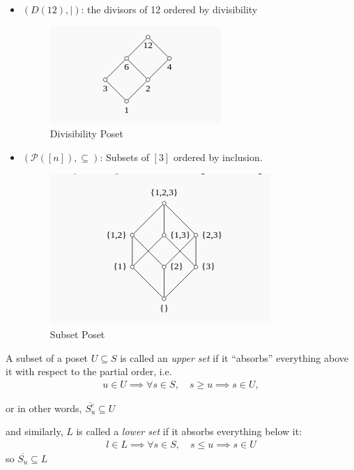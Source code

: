 \begin{example}

\hfill

\begin{itemize}
\item
  \((D(12), \mid)\): the divisors of 12 ordered by divisibility

  \begin{figure}
  \centering
  \includegraphics{figures/2019-06-08-23-30-20.png}
  \caption{Divisibility Poset}
  \end{figure}
\item
  \((\mathcal{P}([n]), \subseteq)\): Subsets of \([3]\) ordered by
  inclusion.

  \begin{figure}
  \centering
  \includegraphics{figures/2019-06-08-23-29-44.png}
  \caption{Subset Poset}
  \end{figure}
\end{itemize}

\end{example}

\begin{definition}

A subset of a poset \(U \subseteq S\) is called an \emph{upper set} if
it ``absorbs'' everything above it with respect to the partial order,
i.e.
\begin{align*}
u\in U \implies \forall s\in S, \quad s \geq u \implies s \in U,
\end{align*}

or in other words, \(\overline{S_u^c} \subseteq U\)

and similarly, \(L\) is called a \emph{lower set} if it absorbs
everything below it:
\begin{align*}
l \in L \implies \forall s\in S, \quad s \leq u \implies s \in U
\end{align*} so \(\overline{S_u} \subseteq L\)

\end{definition}

